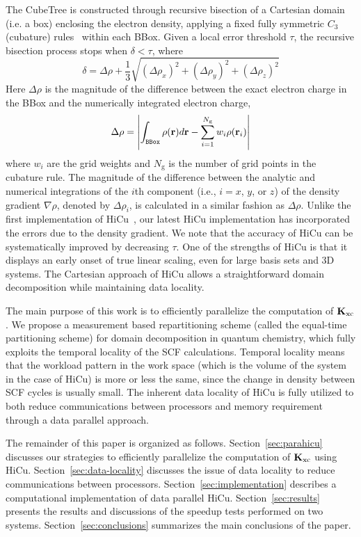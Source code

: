 \documentclass[preprint]{revtex4}
\newcommand{\Kxc}{{\bf K}_{\mathrm{xc}}}
\begin{document}
The CubeTree is constructed through recursive bisection of a Cartesian
domain (i.e. a box) enclosing the electron density, applying a fixed
fully symmetric $C_3$ (cubature) rules~\cite{Stroud71} within each
BBox.  Given a local error threshold $\tau$, the
recursive bisection process stops when $\delta < \tau$, where
\begin{equation}
\delta = \Delta \rho+ \frac{1}{3} \sqrt{(\Delta \rho_x)^2 + (\Delta
\rho_y)^2 + (\Delta \rho_z)^2}
\label{eq:delta}
\end{equation}
Here $\Delta \rho$ is the magnitude of the difference between the
exact electron charge in the BBox and the numerically integrated
electron charge,
\begin{equation}
\Delta \rho = \left|\int_{\tt{BBox}}\rho({\bf r}) d{\bf r} -
\sum_{i=1}^{N_{\mathrm{g}}} w_i\rho({\bf r}_i)\right|
\end{equation}
where $w_i$ are the grid weights and $N_{\mathrm{g}}$ is the number of
grid points in the cubature rule. The magnitude of the difference
between the analytic and numerical integrations of the $i$th component
(i.e., $i = x$, $y$, or $z$) of the density gradient $\nabla \rho$,
denoted by $\Delta \rho_i $, is calculated in a similar fashion as
$\Delta \rho$.  Unlike the first implementation of
HiCu~\cite{Challacombe_00v113}, our latest HiCu implementation has
incorporated the errors due to the density gradient.  We note that the
accuracy of HiCu can be systematically improved by decreasing $\tau$.
One of the strengths of HiCu is that it displays an early onset of
true linear scaling, even for large basis sets and 3D systems.  The
Cartesian approach of HiCu allows a straightforward domain
decomposition while maintaining data locality.

The main purpose of this work is to efficiently parallelize the
computation of $\Kxc$. We propose a measurement based repartitioning
scheme (called the equal-time partitioning scheme) for domain
decomposition in quantum chemistry, which fully exploits the temporal
locality of the SCF calculations. Temporal
locality means that the workload pattern in the work space (which is
the volume of the system in the case of HiCu) is more or less the same, since the
change in density between SCF cycles is usually small. The inherent data
locality of HiCu is fully utilized to both reduce communications
between processors and memory requirement through a data parallel
approach.

The remainder of this paper is organized as follows.
Section~\ref{sec:parahicu} discusses our strategies to efficiently
parallelize the computation of $\Kxc$ using HiCu.
Section~\ref{sec:data-locality} discusses the issue of data locality
to reduce communications between processors.
Section~\ref{sec:implementation} describes a computational
implementation of data parallel HiCu.  Section~\ref{sec:results}
presents the results and discussions of the speedup tests performed on
two systems. Section~\ref{sec:conclusions} summarizes the main
conclusions of the paper.
\end{document}
